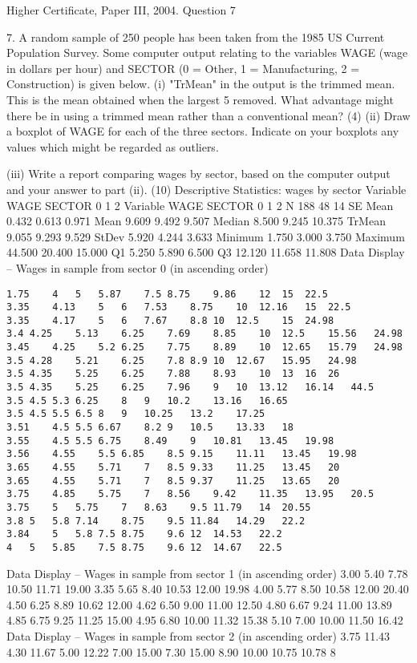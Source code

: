 \documentclass[a4paper,12pt]{article}
\begin{document}
Higher Certificate, Paper III, 2004.  Question 7 
 
\begin{framed}
7.
A random sample of 250 people has been taken from the 1985 US Current Population
Survey. Some computer output relating to the variables WAGE (wage in dollars per
hour) and SECTOR (0 = Other, 1 = Manufacturing, 2 = Construction) is given below.
(i) "TrMean" in the output is the trimmed mean. This is the mean obtained when
the largest 5%
removed. What advantage might there be in using a trimmed mean rather than
a conventional mean?
(4)
(ii) Draw a boxplot of WAGE for each of the three sectors. Indicate on your
boxplots any values which might be regarded as outliers.
\end{framed}
\begin{framed}
(iii) Write a report comparing wages by sector, based on the computer output and
your answer to part (ii).
(10)
Descriptive Statistics: wages by sector
Variable
WAGE SECTOR
0
1
2
Variable
WAGE SECTOR
0
1
2
N
188
48
14
SE Mean
0.432
0.613
0.971
Mean
9.609
9.492
9.507 Median
8.500
9.245
10.375 TrMean
9.055
9.293
9.529 StDev
5.920
4.244
3.633
Minimum
1.750
3.000
3.750 Maximum
44.500
20.400
15.000 Q1
5.250
5.890
6.500 Q3
12.120
11.658
11.808
Data Display – Wages in sample from sector 0 (in ascending order)
\begin{verbatim}
1.75	4	5	5.87	7.5	8.75	9.86	12	15	22.5
3.35	4.13	5	6	7.53	8.75	10	12.16	15	22.5
3.35	4.17	5	6	7.67	8.8	10	12.5	15	24.98
3.4	4.25	5.13	6.25	7.69	8.85	10	12.5	15.56	24.98
3.45	4.25	5.2	6.25	7.75	8.89	10	12.65	15.79	24.98
3.5	4.28	5.21	6.25	7.8	8.9	10	12.67	15.95	24.98
3.5	4.35	5.25	6.25	7.88	8.93	10	13	16	26
3.5	4.35	5.25	6.25	7.96	9	10	13.12	16.14	44.5
3.5	4.5	5.3	6.25	8	9	10.2	13.16	16.65	
3.5	4.5	5.5	6.5	8	9	10.25	13.2	17.25	
3.51	4.5	5.5	6.67	8.2	9	10.5	13.33	18	
3.55	4.5	5.5	6.75	8.49	9	10.81	13.45	19.98	
3.56	4.55	5.5	6.85	8.5	9.15	11.11	13.45	19.98	
3.65	4.55	5.71	7	8.5	9.33	11.25	13.45	20	
3.65	4.55	5.71	7	8.5	9.37	11.25	13.65	20	
3.75	4.85	5.75	7	8.56	9.42	11.35	13.95	20.5	
3.75	5	5.75	7	8.63	9.5	11.79	14	20.55	
3.8	5	5.8	7.14	8.75	9.5	11.84	14.29	22.2	
3.84	5	5.8	7.5	8.75	9.6	12	14.53	22.2	
4	5	5.85	7.5	8.75	9.6	12	14.67	22.5	
\end{verbatim}
Data Display – Wages in sample from sector 1 (in ascending order)
3.00
5.40
7.78
10.50
11.71
19.00
3.35
5.65
8.40
10.53
12.00
19.98
4.00
5.77
8.50
10.58
12.00
20.40
4.50
6.25
8.89
10.62
12.00
4.62
6.50
9.00
11.00
12.50
4.80
6.67
9.24
11.00
13.89
4.85
6.75
9.25
11.25
15.00
4.95
6.80
10.00
11.32
15.38
5.10
7.00
10.00
11.50
16.42
Data Display – Wages in sample from sector 2 (in ascending order)
3.75
11.43
4.30
11.67
5.00
12.22
7.00
15.00
7.30
15.00
8.90
10.00
10.75
10.78
8

\end{framed}
\end{document}
